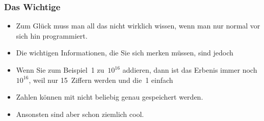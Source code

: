 \documentclass[aspectratio=169,mathserif,notheorems]{beamer}%
\begin{document}
%
\begin{frame}%
\frametitle{Das Wichtige}%
\begin{itemize}%
\item Zum Glück muss man all das nicht wirklich wissen, wenn man nur normal vor sich hin programmiert.%
\item<2-> Die wichtigen Informationen, die Sie sich merken müssen, sind jedoch
%
\item<7-> Wenn Sie zum Beispiel~1 zu~$10^{16}$ addieren, dann ist das Erbenis immer noch~$10^{16}$, weil nur 15~Ziffern  werden und die~1 einfach %
%
\item<8-> \alert{Zahlen können mit  nicht beliebig genau gespeichert werden\cite{PSF:P3D:TPT:FPAIAL}.}%
\item<9-> Ansonsten sind  aber schon ziemlich cool.%
\end{itemize}%
\end{frame}%
%
\end{document}
